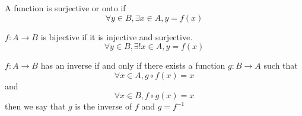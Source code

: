 \documentclass[11pt]{book}
\begin{document}
\begin{defn}[Onto]\label{defn:onto}
    A function is surjective or onto if
    \[
    \forall y \in B, \exists x \in A, y= f\left(x\right) 
    \]
\end{defn}

\begin{defn}[Bijective]\label{defn:bijective}
    $f : A \to B $ is bijective if it is injective and surjective.
    \[
    \forall y \in B, \exists! x \in A, y= f\left(x\right) 
    \]
\end{defn}

\newpage

\begin{defn}[Inverse]\label{defn:inverse}
    $f : A \to B $ has an inverse if and only if there exists a function $g : B \to A $ such that 
    \[
        \forall x \in A, g \circ f\left( x \right) = x 
    \]
    and
    \[
    \forall x \in B, f \circ g \left(x\right) = x
    \]
    then we say that $g $ is the inverse of $f$ and $g = f^{-1} $ 
\end{defn}


\end{document}
